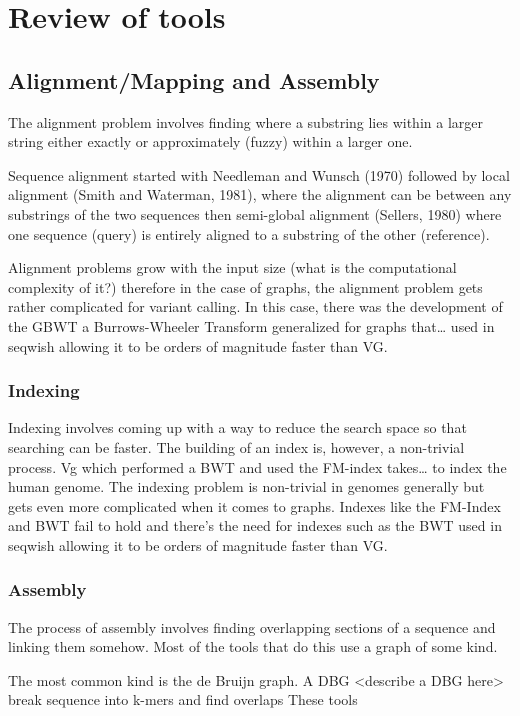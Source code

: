 \documentclass[11pt]{article}
\begin{document}
\section{Review of tools}
\label{sec:orgb02052d}
\subsection{Alignment/Mapping and Assembly}
\label{sec:orgf51802d}
The alignment problem involves finding where a substring lies within a larger string either exactly or approximately (fuzzy) within a larger one.

Sequence alignment started with Needleman and Wunsch (1970) followed by local alignment (Smith and Waterman, 1981), where the alignment can be between any substrings of the two sequences then semi-global alignment (Sellers, 1980) where one sequence (query) is entirely aligned to a substring of the other (reference).

Alignment problems grow with the input size (what is the computational complexity of it?) therefore in the case of graphs, the alignment problem gets rather complicated for variant calling. In this case, there was the development of the GBWT a Burrows-Wheeler Transform generalized for graphs that… used in seqwish allowing it to be orders of magnitude faster than VG.

\subsubsection{Indexing}
\label{sec:org4d856d1}
Indexing involves coming up with a way to reduce the search space so that searching can be faster. The building of an index is, however, a non-trivial process. Vg which performed a BWT and used the FM-index takes… to index the human genome.
The indexing problem is non-trivial in genomes generally but gets even more complicated when it comes to graphs. Indexes like the FM-Index and BWT fail to hold and there’s the need for indexes such as the BWT used in seqwish allowing it to be orders of magnitude faster than VG.

\subsubsection{Assembly}
\label{sec:org8954557}
The process of assembly involves finding overlapping sections of a sequence and linking them somehow. Most of the tools that do this use a graph of some kind.

The most common kind is the de Bruijn graph. A DBG <describe a DBG here> break sequence into k-mers and find overlaps
These tools
\end{document}
